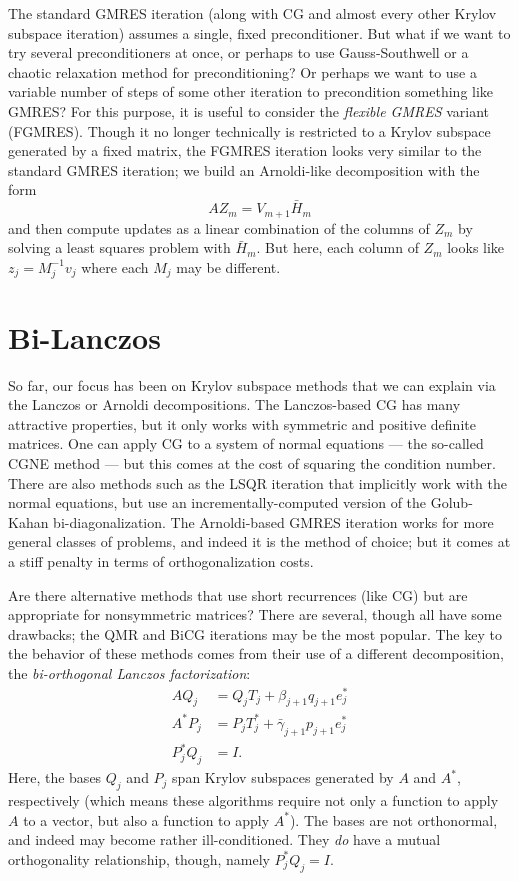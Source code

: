 \documentclass[12pt, leqno]{article} %
\begin{document}
The standard GMRES iteration (along with CG and almost every other
Krylov subspace iteration) assumes a single, fixed preconditioner.
But what if we want to try several preconditioners at once, or
perhaps to use Gauss-Southwell or a chaotic relaxation method for
preconditioning?  Or perhaps we want to use a variable number of
steps of some other iteration to precondition something like GMRES?
For this purpose, it is useful to consider the
{\em flexible GMRES} variant (FGMRES).  Though it no longer technically
is restricted to a Krylov subspace generated by a fixed matrix, the
FGMRES iteration looks very similar to the standard GMRES iteration;
we build an Arnoldi-like decomposition with the form
\[
  AZ_m = V_{m+1} \bar{H}_m
\]
and then compute updates as a linear combination of the columns of $Z_m$
by solving a least squares problem with $\bar{H}_m$.  But here, each
column of $Z_m$ looks like $z_j = M_j^{-1} v_j$ where each $M_j$ may
be different.

\section{Bi-Lanczos}

So far, our focus has been on Krylov subspace methods that we can
explain via the Lanczos or Arnoldi decompositions.  The Lanczos-based
CG has many attractive properties, but it only works with symmetric
and positive definite matrices.  One can apply CG to a system of normal
equations --- the so-called CGNE method --- but this comes at the cost
of squaring the condition number.  There are also methods such as the
LSQR iteration that implicitly work with the normal equations, but use
an incrementally-computed version of the Golub-Kahan bi-diagonalization.
The Arnoldi-based GMRES iteration works for more general classes
of problems, and indeed it is the method of choice; but it comes at
a stiff penalty in terms of orthogonalization costs.

Are there alternative methods that use short recurrences (like CG) but
are appropriate for nonsymmetric matrices?  There are several, though
all have some drawbacks; the QMR and BiCG iterations may be the most
popular.  The key to the behavior of these methods comes from their
use of a different decomposition, the {\em bi-orthogonal Lanczos
factorization}:
\begin{align*}
  A Q_j &= Q_j T_j + \beta_{j+1} q_{j+1} e_j^* \\
  A^* P_j &= P_j T_j^* + \bar{\gamma}_{j+1} p_{j+1} e_j^* \\
  P_j^* Q_j &= I.
\end{align*}
Here, the bases $Q_j$ and $P_j$ span Krylov subspaces generated
by $A$ and $A^*$, respectively (which means these algorithms require
not only a function to apply $A$ to a vector, but also a function
to apply $A^*$).  The bases are not orthonormal, and indeed may become
rather ill-conditioned.  They {\em do} have a mutual orthogonality
relationship, though, namely $P_j^* Q_j = I$.
\end{document}
